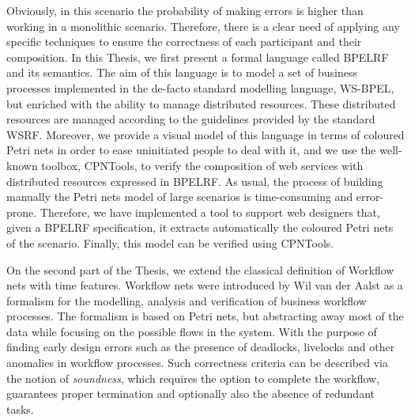 Obviously, in this scenario the probability of making errors is higher than working in a monolithic scenario. Therefore, there is
a clear need of applying any specific techniques to ensure the correctness of each participant and their composition.
In this Thesis, we first present a formal language called BPELRF and its semantics. The aim of this language is
to model a set of business processes implemented in the de-facto standard modelling language, WS-BPEL, but
enriched with the ability to manage distributed resources. These distributed resources are managed according to
the guidelines provided by the standard WSRF. Moreover, we provide a visual model of this language in terms of 
coloured Petri nets in order to ease uninitiated people to deal with it, and we use the well-known toolbox, CPNTools,
to verify the composition of web services with distributed resources expressed in BPELRF. As usual, the process of building manually
the Petri nets model of large scenarios is time-consuming and error-prone. Therefore,
we have implemented a tool to support web designers that, given a BPELRF specification, it extracts automatically the coloured 
Petri nets of the scenario. Finally, this model can be verified using CPNTools.

On the second part of the Thesis, we extend the classical definition of Workflow nets with time features. 
Workflow nets were introduced 
by Wil van der Aalst as a formalism
for the modelling, analysis and verification of business workflow processes.
The formalism is based on Petri nets, but abstracting away most of the data 
while focusing on the possible flows in the system. 
With the purpose of finding early design errors 
such as the presence of deadlocks, livelocks 
and other anomalies in workflow processes. Such correctness criteria can
be described via the notion of \emph{soundness}, which
requires the option to complete the workflow, guarantees proper termination
and optionally also the absence of redundant tasks. 

